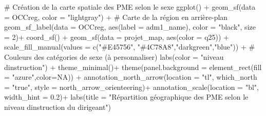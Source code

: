 \documentclass[
  letterpaper,
  DIV=11,
  numbers=noendperiod]{scrartcl}
\newenvironment{Shaded}{\begin{snugshade}}{\end{snugshade}}
\newcommand{\AttributeTok}[1]{\textcolor[rgb]{0.40,0.45,0.13}{#1}}
\newcommand{\CommentTok}[1]{\textcolor[rgb]{0.37,0.37,0.37}{#1}}
\newcommand{\ConstantTok}[1]{\textcolor[rgb]{0.56,0.35,0.01}{#1}}
\newcommand{\DecValTok}[1]{\textcolor[rgb]{0.68,0.00,0.00}{#1}}
\newcommand{\FloatTok}[1]{\textcolor[rgb]{0.68,0.00,0.00}{#1}}
\newcommand{\FunctionTok}[1]{\textcolor[rgb]{0.28,0.35,0.67}{#1}}
\newcommand{\NormalTok}[1]{\textcolor[rgb]{0.00,0.23,0.31}{#1}}
\newcommand{\SpecialCharTok}[1]{\textcolor[rgb]{0.37,0.37,0.37}{#1}}
\newcommand{\StringTok}[1]{\textcolor[rgb]{0.13,0.47,0.30}{#1}}
\begin{document}
\begin{Shaded}
\begin{Highlighting}[]
\CommentTok{\# Création de la carte spatiale des PME selon le sexe}
\FunctionTok{ggplot}\NormalTok{() }\SpecialCharTok{+}
  \FunctionTok{geom\_sf}\NormalTok{(}\AttributeTok{data =}\NormalTok{ OCCreg, }\AttributeTok{color =} \StringTok{"lightgray"}\NormalTok{) }\SpecialCharTok{+}  \CommentTok{\# Carte de la région en arrière{-}plan}
  \FunctionTok{geom\_sf\_label}\NormalTok{(}\AttributeTok{data =}\NormalTok{ OCCreg, }\FunctionTok{aes}\NormalTok{(}\AttributeTok{label =}\NormalTok{ adm1\_name), }\AttributeTok{color =} \StringTok{"black"}\NormalTok{, }\AttributeTok{size =} \DecValTok{2}\NormalTok{)}\SpecialCharTok{+}
  \FunctionTok{coord\_sf}\NormalTok{() }\SpecialCharTok{+}
  \FunctionTok{geom\_sf}\NormalTok{(}\AttributeTok{data =}\NormalTok{ projet\_map, }\FunctionTok{aes}\NormalTok{(}\AttributeTok{color =}\NormalTok{ q25)) }\SpecialCharTok{+}
  \FunctionTok{scale\_fill\_manual}\NormalTok{(}\AttributeTok{values =} \FunctionTok{c}\NormalTok{(}\StringTok{"\#E45756"}\NormalTok{, }\StringTok{"\#4C78A8"}\NormalTok{,}\StringTok{"darkgreen"}\NormalTok{,}\StringTok{"blue"}\NormalTok{)) }\SpecialCharTok{+}  \CommentTok{\# Couleurs des catégories de sexe (à personnaliser)}
  \FunctionTok{labs}\NormalTok{(}\AttributeTok{color =} \StringTok{"niveau d\textquotesingle{}instruction"}\NormalTok{) }\SpecialCharTok{+}
  \FunctionTok{theme\_minimal}\NormalTok{()}\SpecialCharTok{+}
  \FunctionTok{theme}\NormalTok{(}\AttributeTok{panel.background =} \FunctionTok{element\_rect}\NormalTok{(}\AttributeTok{fill =} \StringTok{"azure"}\NormalTok{,}\AttributeTok{color=}\ConstantTok{NA}\NormalTok{)) }\SpecialCharTok{+}
  \FunctionTok{annotation\_north\_arrow}\NormalTok{(}\AttributeTok{location =} \StringTok{"tl"}\NormalTok{, }\AttributeTok{which\_north =} \StringTok{"true"}\NormalTok{, }\AttributeTok{style =}\NormalTok{ north\_arrow\_orienteering)}\SpecialCharTok{+}
  \FunctionTok{annotation\_scale}\NormalTok{(}\AttributeTok{location =} \StringTok{"bl"}\NormalTok{, }\AttributeTok{width\_hint =} \FloatTok{0.2}\NormalTok{)}\SpecialCharTok{+}
  \FunctionTok{labs}\NormalTok{(}\AttributeTok{title =} \StringTok{"Répartition géographique des PME selon le niveau d\textquotesingle{}instruction du dirigeant"}\NormalTok{)}
\end{Highlighting}
\end{Shaded}
\end{document}
